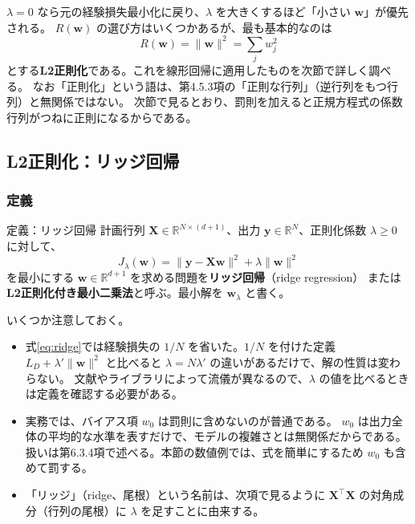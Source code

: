 $\lambda = 0$ なら元の経験損失最小化に戻り、$\lambda$ を大きくするほど「小さい $\bm{w}$」が優先される。
$R(\bm{w})$ の選び方はいくつかあるが、最も基本的なのは
\begin{equation}
  R(\bm{w}) = \|\bm{w}\|^2 = \sum_{j} w_j^2
\end{equation}
とする\textbf{L2正則化}である。これを線形回帰に適用したものを次節で詳しく調べる。
なお「正則化」という語は、第4.5.3項の「正則な行列」（逆行列をもつ行列）と無関係ではない。
次節で見るとおり、罰則を加えると正規方程式の係数行列がつねに正則になるからである。


\subsection{L2正則化：リッジ回帰}

\subsubsection{定義}

\begin{itembox}[l]{定義：リッジ回帰}
計画行列 $\bm{X} \in \mathbb{R}^{N \times (d+1)}$、出力 $\bm{y} \in \mathbb{R}^N$、正則化係数 $\lambda \geq 0$ に対して、
\begin{equation}
  J_\lambda(\bm{w}) = \|\bm{y} - \bm{X}\bm{w}\|^2 + \lambda\|\bm{w}\|^2
  \label{eq:ridge}
\end{equation}
を最小にする $\bm{w} \in \mathbb{R}^{d+1}$ を求める問題を\textbf{リッジ回帰}（ridge regression）
または\textbf{L2正則化付き最小二乗法}と呼ぶ。最小解を $\bm{w}_\lambda$ と書く。
\end{itembox}

いくつか注意しておく。
\begin{itemize}
  \item 式\eqref{eq:ridge}では経験損失の $1/N$ を省いた。$1/N$ を付けた定義 $L_D + \lambda'\|\bm{w}\|^2$ と比べると
    $\lambda = N\lambda'$ の違いがあるだけで、解の性質は変わらない。
    文献やライブラリによって流儀が異なるので、$\lambda$ の値を比べるときは定義を確認する必要がある。
  \item 実務では、バイアス項 $w_0$ は罰則に含めないのが普通である。
    $w_0$ は出力全体の平均的な水準を表すだけで、モデルの複雑さとは無関係だからである。
    扱いは第6.3.4項で述べる。本節の数値例では、式を簡単にするため $w_0$ も含めて罰する。
  \item 「リッジ」（ridge、尾根）という名前は、次項で見るように $\bm{X}^\top\bm{X}$ の対角成分（行列の尾根）に $\lambda$ を足すことに由来する。
\end{itemize}

